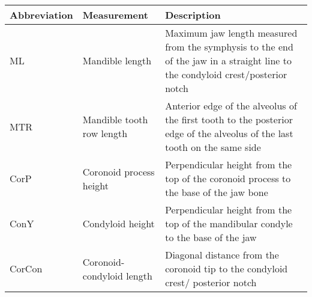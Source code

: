 
\begin{tabular}{lp{3.5cm}p{9.75cm}}
\hline
\textbf{Abbreviation} & \textbf{Measurement} & \textbf{Description}\\
\hline
ML & Mandible length & Maximum jaw length measured from the symphysis to the end of the jaw in a straight line to the condyloid crest/posterior notch\\
MTR & Mandible tooth row length & Anterior edge of the alveolus of the first tooth to the posterior edge of the alveolus of the last tooth on the same side\\
CorP & Coronoid process height & Perpendicular height from the top of the coronoid process to the base of the jaw bone\\
ConY & Condyloid height & Perpendicular height from the top of the mandibular condyle to the base of the jaw\\
CorCon & Coronoid-condyloid length & Diagonal distance from the coronoid tip to the condyloid crest/ posterior notch \citep{Carraway1996}\\
\hline
\end{tabular}